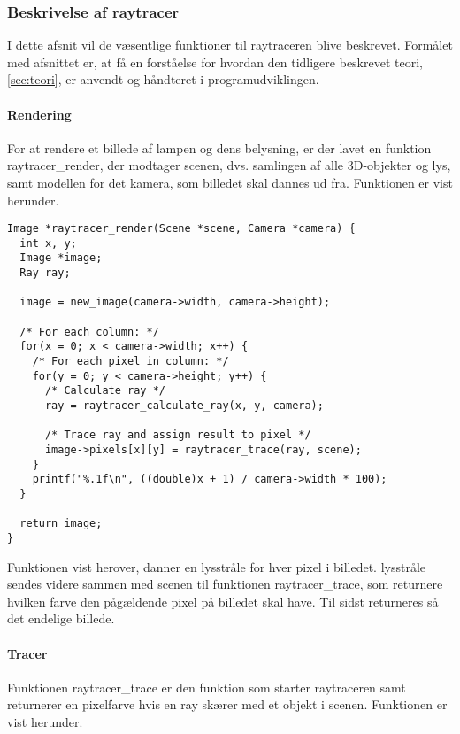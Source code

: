 \subsubsection{Beskrivelse af raytracer}
I dette afsnit vil de væsentlige funktioner til raytraceren blive beskrevet. Formålet med afsnittet er, at få en forståelse for hvordan den tidligere beskrevet teori, \ref{sec:teori}, er anvendt og håndteret i programudviklingen.


\paragraph{Rendering}
For at rendere et billede af lampen og dens belysning, er der lavet en funktion raytracer\_render, der modtager scenen, dvs. samlingen af alle 3D-objekter og lys, samt modellen for det kamera, som billedet skal dannes ud fra. Funktionen er vist herunder.

\begin{lstlisting}[style=Cstyle, caption=Funktionen der rendere billedet af scenen med et kameras perspektiv]
Image *raytracer_render(Scene *scene, Camera *camera) {
  int x, y;
  Image *image;
  Ray ray;

  image = new_image(camera->width, camera->height);
  
  /* For each column: */
  for(x = 0; x < camera->width; x++) {
    /* For each pixel in column: */
    for(y = 0; y < camera->height; y++) {
      /* Calculate ray */
      ray = raytracer_calculate_ray(x, y, camera);
      
      /* Trace ray and assign result to pixel */
      image->pixels[x][y] = raytracer_trace(ray, scene);
    }
    printf("%.1f\n", ((double)x + 1) / camera->width * 100);
  }

  return image;
}
\end{lstlisting}

Funktionen vist herover, danner en lysstråle for hver pixel i billedet. lysstråle sendes videre sammen med scenen til funktionen raytracer\_trace, som returnere hvilken farve den pågældende pixel på billedet skal have. Til sidst returneres så det endelige billede.

\paragraph{Tracer}
Funktionen raytracer\_trace er den funktion som starter raytraceren samt returnerer en pixelfarve hvis en ray skærer med et objekt i scenen. Funktionen er vist herunder.  

